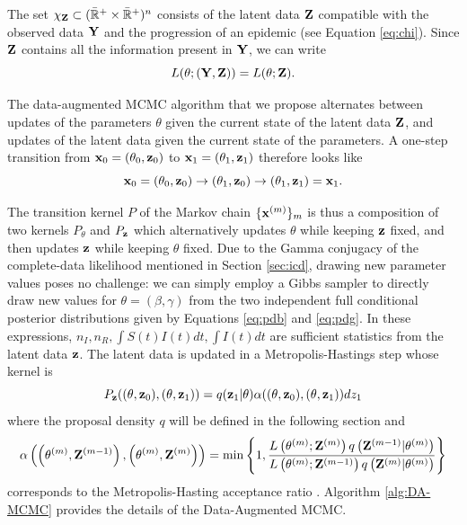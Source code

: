 \documentclass[11pt]{article}
\newcommand{\jx}[1]{{\color{blue}{ #1}}}
\begin{document}
	The set $\chi_{\mathbf{Z}} \subset (\bar{\mathbb{R}}^+ \times \bar{\mathbb{R}}^+)^n$ consists of the latent data $\mathbf{Z}$ compatible with the observed data $\mathbf{Y}$ and the progression of an epidemic (see Equation \ref{eq:chi}). Since $\mathbf{Z}$ contains all the information present in $\mathbf{Y}$, we can write
	$$L(\theta; (\mathbf{Y}, \mathbf{Z})) = L(\theta; \mathbf{Z}).$$
	
	
	The data-augmented MCMC algorithm that we propose alternates between updates of the parameters $\theta$ given the current state of the latent data $\mathbf{Z}$, and updates of the latent data given the current state of the parameters. A one-step transition from $\mathbf{x}_0 = (\theta_0, \mathbf{z}_0)$ to $\mathbf{x}_1 = (\theta_1, \mathbf{z}_1)$ therefore looks like
	$$\mathbf{x}_0 = (\theta_0, \mathbf{z}_0) \rightarrow (\theta_1, \mathbf{z}_0) \rightarrow (\theta_1, \mathbf{z}_1) = \mathbf{x}_1.$$
	
	The transition kernel $P$ of the Markov chain $\{\mathbf{x}^{(m)}\}_m$ is thus a composition of two kernels $P_{\theta}$ and $P_{\mathbf{z}}$ which alternatively updates $\theta$ while keeping $\mathbf{z}$ fixed, and then updates $\mathbf{z}$ while keeping $\theta$ fixed. Due to the Gamma conjugacy of the complete-data likelihood mentioned in Section \ref{sec:icd}, drawing new parameter values poses no challenge: we can simply employ a Gibbs sampler to directly draw new values for $\theta = (\beta, \gamma)$ from the two independent full conditional posterior distributions given by Equations \ref{eq:pdb} and \ref{eq:pdg}. In these expressions, $n_I, n_R, \int S(t)I(t) dt, \int I(t) dt$ are sufficient statistics from the latent data $\mathbf{z}$. The latent data is updated in a Metropolis-Hastings step whose kernel is
	$$
	P_{\mathbf{z}}((\theta, \mathbf{z}_0), (\theta, \mathbf{z}_1)) = q(\mathbf{z}_1|\theta) \alpha((\theta, \mathbf{z}_0), (\theta, \mathbf{z}_1)) dz_1
	$$
	where the proposal density $q$ will be defined in the following section and
	$$
	\alpha\left( \left( \theta^{(m)}, \mathbf{Z}^{(m-1)}\right) , \left( \theta^{(m)}, \mathbf{Z}^{(m)}\right) \right) = \min\left\lbrace 1, \dfrac{L\left( \theta^{(m)}; \mathbf{Z}^{(m)}\right) q\left( \mathbf{Z}^{(m - 1)}|\theta^{(m)}\right) }{L\left( \theta^{(m)};\mathbf{Z}^{(m - 1)}\right) q\left( \mathbf{Z}^{(m)}|\theta^{(m)}\right) }\right\rbrace
	$$
	corresponds to the Metropolis-Hasting acceptance ratio \cite{Tierney.1994}.	
	Algorithm \ref{alg:DA-MCMC} provides the details of the Data-Augmented MCMC.
	
\end{document}
